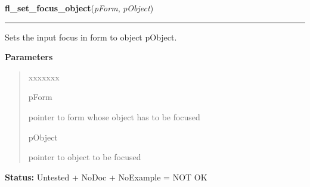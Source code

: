 \hspace{.8\funcindent}\begin{boxedminipage}{\funcwidth}

    \raggedright \textbf{fl\_set\_focus\_object}(\textit{pForm}, \textit{pObject})

    \vspace{-1.5ex}

    \rule{\textwidth}{0.5\fboxrule}
\setlength{\parskip}{2ex}
    Sets the input focus in form to object pObject.

\setlength{\parskip}{1ex}
      \textbf{Parameters}
      \vspace{-1ex}

      \begin{quote}
        \begin{Ventry}{xxxxxxx}

          \item[pForm]

          pointer to form whose object has to be focused

          \item[pObject]

          pointer to object to be focused

        \end{Ventry}

      \end{quote}

\textbf{Status:} Untested + NoDoc + NoExample = NOT OK



    \end{boxedminipage}

    \label{xformslib:library:fl_set_focus_object}

    \vspace{0.5ex}

